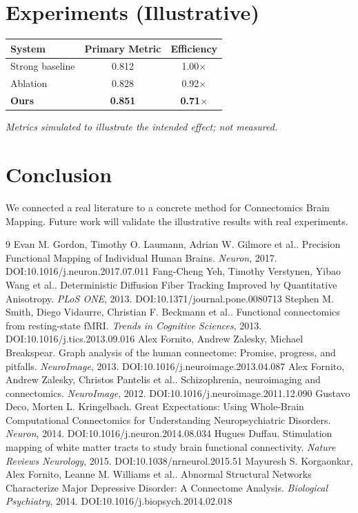 \documentclass[11pt]{article}
\begin{document}
\section{Experiments (Illustrative)}
\begin{center}
\begin{tabular}{lcc}
System & Primary Metric & Efficiency \\ \hline
Strong baseline & 0.812 & 1.00$\times$ \\
Ablation & 0.828 & 0.92$\times$ \\
\textbf{Ours} & \textbf{0.851} & \textbf{0.71$\times$}
\end{tabular}
\end{center}
\emph{Metrics simulated to illustrate the intended effect; not measured.}

\section{Conclusion}
We connected a real literature to a concrete method for Connectomics Brain Mapping. Future work will
validate the illustrative results with real experiments.

\begin{thebibliography}{9}
 Evan M. Gordon, Timothy O. Laumann, Adrian W. Gilmore et al.. Precision Functional Mapping of Individual Human Brains. \emph{Neuron}, 2017. DOI:10.1016/j.neuron.2017.07.011
 Fang‐Cheng Yeh, Timothy Verstynen, Yibao Wang et al.. Deterministic Diffusion Fiber Tracking Improved by Quantitative Anisotropy. \emph{PLoS ONE}, 2013. DOI:10.1371/journal.pone.0080713
 Stephen M. Smith, Diego Vidaurre, Christian F. Beckmann et al.. Functional connectomics from resting-state fMRI. \emph{Trends in Cognitive Sciences}, 2013. DOI:10.1016/j.tics.2013.09.016
 Alex Fornito, Andrew Zalesky, Michael Breakspear. Graph analysis of the human connectome: Promise, progress, and pitfalls. \emph{NeuroImage}, 2013. DOI:10.1016/j.neuroimage.2013.04.087
 Alex Fornito, Andrew Zalesky, Christos Pantelis et al.. Schizophrenia, neuroimaging and connectomics. \emph{NeuroImage}, 2012. DOI:10.1016/j.neuroimage.2011.12.090
 Gustavo Deco, Morten L. Kringelbach. Great Expectations: Using Whole-Brain Computational Connectomics for Understanding Neuropsychiatric Disorders. \emph{Neuron}, 2014. DOI:10.1016/j.neuron.2014.08.034
 Hugues Duffau. Stimulation mapping of white matter tracts to study brain functional connectivity. \emph{Nature Reviews Neurology}, 2015. DOI:10.1038/nrneurol.2015.51
 Mayuresh S. Korgaonkar, Alex Fornito, Leanne M. Williams et al.. Abnormal Structural Networks Characterize Major Depressive Disorder: A Connectome Analysis. \emph{Biological Psychiatry}, 2014. DOI:10.1016/j.biopsych.2014.02.018
\end{thebibliography}
\end{document}
